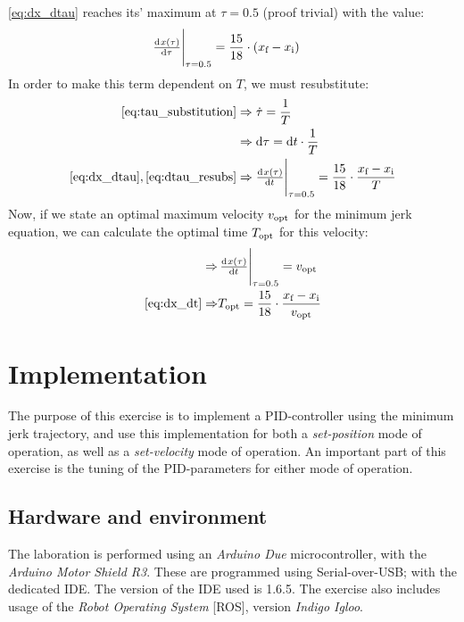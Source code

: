 \documentclass[11pt]{article}
\begin{document}
\ref{eq:dx_dtau} reaches its' maximum at $\tau=0.5$ (proof trivial) with the value:
\begin{align}
  \eval{\od{x(\tau)}{\tau}}_{\tau=0.5}&=\frac{15}{18}\cdot(\di{x}{f} - \di{x}{i})
\end{align}
In order to make this term dependent on $T$, we must resubstitute:
\begin{align}
  \ref{eq:tau_substitution}&\Rightarrow %
\dot{\tau}
=\frac{1}{T}\\
  &\Rightarrow\dif\tau=\dif t\cdot\frac{1}{T}\label{eq:dtau_resubs}\\
  \ref{eq:dx_dtau},\ref{eq:dtau_resubs}&\Rightarrow%
\eval{\od{x(\tau)}{t}}
_{\tau=0.5}=\frac{15}{18}\cdot\frac{\di{x}{f} - \di{x}{i}}{T}\label{eq:dx_dt}
\end{align}
Now, if we state an optimal maximum velocity $v_\textup{opt}$ for the minimum jerk equation, we can calculate the optimal time $T_\textup{opt}$ for this velocity:
\begin{align}
  \Rightarrow&\eval{\od{x(\tau)}{t}}_{\tau=0.5}=\di{v}{opt}\\
  \ref{eq:dx_dt}\Rightarrow& \di{T}{opt}=\frac{15}{18}\cdot\frac{\di{x}{f} - \di{x}{i}}{\di{v}{opt}}\label{eq:t_opt}
\end{align}
\par

\section{Implementation}
The purpose of this exercise is to implement a PID-controller using the minimum jerk trajectory, and use this implementation for both a \emph{set-position} mode of operation, as well as a \emph{set-velocity} mode of operation. An important part of this exercise is the tuning of the PID-parameters for either mode of operation. \par

\subsection{Hardware and environment}
The laboration is performed using an \emph{Arduino Due} microcontroller, with the \emph{Arduino Motor Shield R3}. These are programmed using Serial-over-USB; with the dedicated IDE. The version of the IDE used is 1.6.5. The exercise also includes usage of the \emph{Robot Operating System} [ROS], version \emph{Indigo Igloo}. \par
\end{document}
